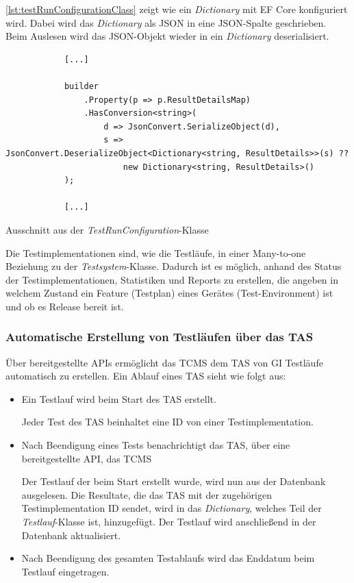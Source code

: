\documentclass[a4paper, fontsize=11pt, parskip=half, twoside]{scrreprt}
\begin{document}
	\autoref{lst:testRunConfigurationClass} zeigt wie ein \emph{Dictionary} mit \ac{EF} Core konfiguriert wird.
	Dabei wird das \emph{Dictionary} als \ac{JSON} in eine \ac{JSON}-Spalte geschrieben.
	Beim Auslesen wird das \ac{JSON}-Objekt wieder in ein \emph{Dictionary} deserialisiert.
	
	\begin{listing}[ht]
		\begin{verbatim}
			[...]	
			
			builder
				.Property(p => p.ResultDetailsMap)
				.HasConversion<string>(
					d => JsonConvert.SerializeObject(d),
					s => JsonConvert.DeserializeObject<Dictionary<string, ResultDetails>>(s) ??
						new Dictionary<string, ResultDetails>()
			);		
			
			[...]
		\end{verbatim}
		\caption{Ausschnitt aus der \emph{TestRunConfiguration}-Klasse}
		\label{lst:testRunConfigurationClass}
	\end{listing}
	
	Die Testimplementationen sind, wie die Testläufe, in einer Many-to-one Beziehung zu der \emph{Testsystem}-Klasse. 
	Dadurch ist es möglich, anhand des Status der Testimplementationen, Statistiken und Reports zu erstellen, die angeben in welchem Zustand ein Feature (Testplan) eines Gerätes (Test-Environment) ist und ob es Release bereit ist.
	
	\subsubsection{Automatische Erstellung von Testläufen über das TAS}
	Über bereitgestellte \ac{API}s ermöglicht das \ac{TCMS} dem \ac{TAS} von \ac{GI} Testläufe automatisch zu erstellen.
	Ein Ablauf eines \ac{TAS} sieht wie folgt aus:
	
	\begin{itemize}
		\item Ein Testlauf wird beim Start des \ac{TAS} erstellt.
		
		Jeder Test des \ac{TAS} beinhaltet eine \ac{ID} von einer Testimplementation.
		
		\item Nach Beendigung eines Tests benachrichtigt das \ac{TAS}, über eine bereitgestellte \ac{API}, das \ac{TCMS}
		
		Der Testlauf der beim Start erstellt wurde, wird nun aus der Datenbank ausgelesen. 
		Die Resultate, die das \ac{TAS} mit der zugehörigen Testimplementation \ac{ID} sendet, wird in das \emph{Dictionary}, welches Teil der \emph{Testlauf}-Klasse ist, hinzugefügt.
		Der Testlauf wird anschließend in der Datenbank aktualisiert.
		
		\item Nach Beendigung des gesamten Testablaufs wird das Enddatum beim Testlauf eingetragen.
	\end{itemize}
	
\end{document}
